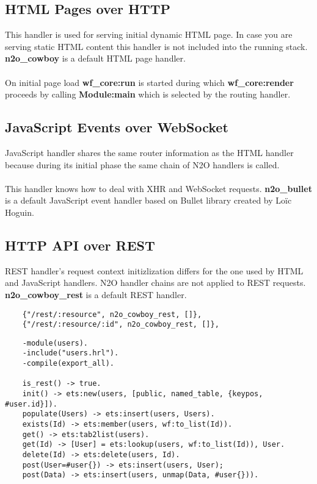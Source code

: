 \subsection{HTML Pages over HTTP}
This handler is used for serving initial dynamic HTML page.
In case you are serving static HTML content this handler is
not included into the running stack. {\bf {n2o}\_{cowboy}} is
a default HTML page handler.

\paragraph{}
On initial page load {\bf {wf}\_{core}:run} is started during
which {\bf {wf}\_{core}:render} proceeds by calling {\bf Module:main} which
is selected by the routing handler.

\subsection{JavaScript Events over WebSocket}
JavaScript handler shares the same router information as the
HTML handler because during its initial phase the same chain
of N2O handlers is called.

\paragraph{}
This handler knows how to deal with XHR and WebSocket requests.
{\bf {n2o}\_{bullet}} is a default JavaScript event handler
based on Bullet library created by Loïc Hoguin.

\newpage
\subsection{HTTP API over REST}
REST handler's request context initizlization differs for the one
used by HTML and JavaScript handlers. N2O handler chains are not
applied to REST requests. {\bf n2o\_cowboy\_rest} is a default REST
handler.

\vspace{1\baselineskip}
\begin{lstlisting}
    {"/rest/:resource", n2o_cowboy_rest, []},
    {"/rest/:resource/:id", n2o_cowboy_rest, []},
\end{lstlisting}

\vspace{1\baselineskip}
\begin{lstlisting}
    -module(users).
    -include("users.hrl").
    -compile(export_all).

    is_rest() -> true.
    init() -> ets:new(users, [public, named_table, {keypos, #user.id}]).
    populate(Users) -> ets:insert(users, Users).
    exists(Id) -> ets:member(users, wf:to_list(Id)).
    get() -> ets:tab2list(users).
    get(Id) -> [User] = ets:lookup(users, wf:to_list(Id)), User.
    delete(Id) -> ets:delete(users, Id).
    post(User=#user{}) -> ets:insert(users, User);
    post(Data) -> ets:insert(users, unmap(Data, #user{})).
\end{lstlisting}
\vspace{1\baselineskip}

